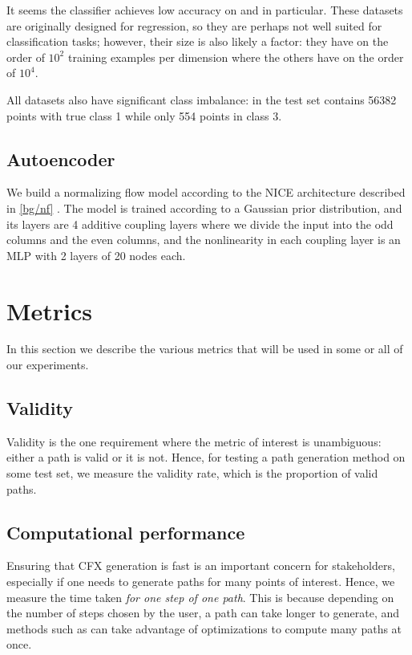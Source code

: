\documentclass[../main.tex]{subfiles}
\begin{document}
It seems the classifier achieves low accuracy on \WineQuality{} and \OnlineNewsPopularity{} in particular.
These datasets are originally designed for regression, so they are perhaps not well suited for classification tasks; however, their size is also likely a factor: they have on the order of $10^2$ training examples per dimension where the others have on the order of $10^4$.

All datasets also have significant class imbalance: in \ForestCover{} the test set contains 56382 points with true class 1 while only 554 points in class 3.

\subsection{Autoencoder}

We build a normalizing flow model according to the NICE architecture described in \autoref{bg/nf} \cite{dinhNICE2015}.
The model is trained according to a Gaussian prior distribution, and its layers are 4 additive coupling layers where we divide the input into the odd columns and the even columns, and the nonlinearity in each coupling layer is an MLP with 2 layers of 20 nodes each.

\section{Metrics}

In this section we describe the various metrics that will be used in some or all of our experiments.

\subsection{Validity}

Validity is the one requirement where the metric of interest is unambiguous: either a path is valid or it is not.
Hence, for testing a path generation method on some test set, we measure the validity rate, which is the proportion of valid paths.

\subsection{Computational performance}

Ensuring that CFX generation is fast is an important concern for stakeholders, especially if one needs to generate paths for many points of interest.
Hence, we measure the time taken \emph{for one step of one path}.
This is because depending on the number of steps chosen by the user, a path can take longer to generate, and methods such as \ls{} can take advantage of optimizations to compute many paths at once.
\end{document}

